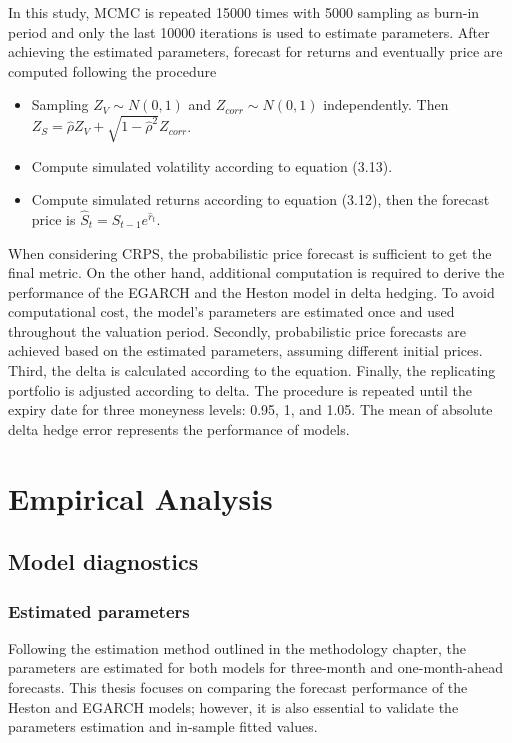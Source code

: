 \documentclass[12pt,a4paper]{article}
\numberwithin{equation}{section}
\begin{document}
In this study, MCMC is repeated 15000 times with 5000 sampling as burn-in period and only the last 10000 iterations is used to estimate parameters. After achieving the estimated parameters, forecast for returns and eventually price are computed following the procedure

\begin{itemize}
\item Sampling $Z_V \sim N(0,1)$ and $Z_{corr} \sim N(0,1)$ independently. Then $Z_S = \hat{\rho} Z_V + \sqrt{1-\hat{\rho}^2} Z_{corr}$.
\item Compute simulated volatility according to equation (3.13).
\item Compute simulated returns according to equation (3.12), then the forecast price is  $\hat{S}_t = \hat{S}_{t-1} e^{\hat{r}_t}$.
\end{itemize}

When considering CRPS, the probabilistic price forecast is sufficient to get the final metric. On the other hand, additional computation is required to derive the performance of the EGARCH and the Heston model in delta hedging. To avoid computational cost, the model's parameters are estimated once and used throughout the valuation period. Secondly, probabilistic price forecasts are achieved based on the estimated parameters, assuming different initial prices. Third, the delta is calculated according to the equation. Finally, the replicating portfolio is adjusted according to delta. The procedure is repeated until the expiry date for three moneyness levels: 0.95, 1, and 1.05. The mean of absolute delta hedge error represents the performance of models.


\section{Empirical Analysis}

\subsection{Model diagnostics}

\subsubsection{Estimated parameters}

Following the estimation method outlined in the methodology chapter, the parameters are estimated for both models for three-month and one-month-ahead forecasts. This thesis focuses on comparing the forecast performance of the Heston and EGARCH models; however, it is also essential to validate the parameters estimation and in-sample fitted values.
\end{document}
